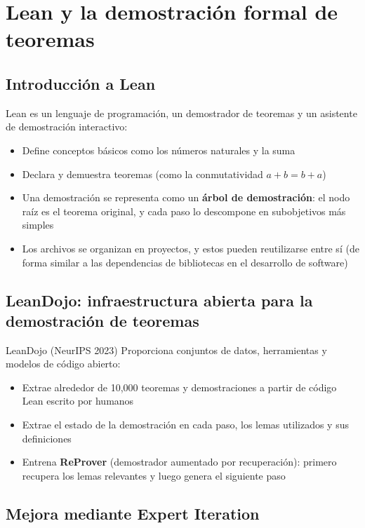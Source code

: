 \section{Lean y la demostración formal de teoremas}

\subsection{Introducción a Lean}

Lean es un lenguaje de programación, un demostrador de teoremas y un asistente de demostración interactivo:
\begin{itemize}
    \item Define conceptos básicos como los números naturales y la suma
    \item Declara y demuestra teoremas (como la conmutatividad $a+b=b+a$)
    \item Una demostración se representa como un \textbf{árbol de demostración}: el nodo raíz es el teorema original, y cada paso lo descompone en subobjetivos más simples
    \item Los archivos se organizan en proyectos, y estos pueden reutilizarse entre sí (de forma similar a las dependencias de bibliotecas en el desarrollo de software)
\end{itemize}

\subsection{LeanDojo: infraestructura abierta para la demostración de teoremas}

\begin{importantbox}{LeanDojo (NeurIPS 2023)}
Proporciona conjuntos de datos, herramientas y modelos de código abierto:
\begin{itemize}
    \item Extrae alrededor de 10,000 teoremas y demostraciones a partir de código Lean escrito por humanos
    \item Extrae el estado de la demostración en cada paso, los lemas utilizados y sus definiciones
    \item Entrena \textbf{ReProver} (demostrador aumentado por recuperación): primero recupera los lemas relevantes y luego genera el siguiente paso
\end{itemize}
\end{importantbox}

\subsection{Mejora mediante Expert Iteration}

